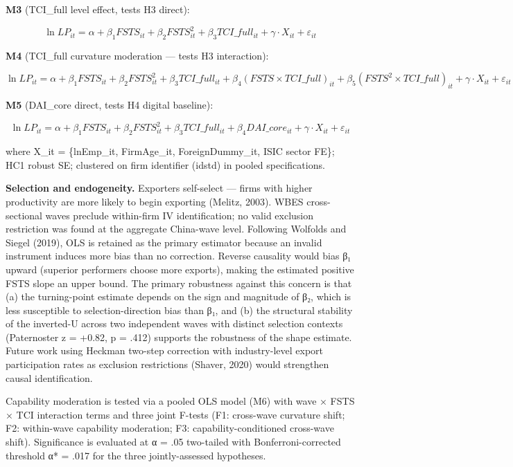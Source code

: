 \documentclass[12pt,a4paper]{article}
\begin{document}
\textbf{M3} (TCI\_full level effect, tests H3 direct):

\[\ln LP_{it} = \alpha + \beta_1 FSTS_{it} + \beta_2 FSTS^2_{it} + \beta_3 TCI\_full_{it} + \gamma \cdot X_{it} + \varepsilon_{it}\]

\textbf{M4} (TCI\_full curvature moderation --- tests H3 interaction):

\[\ln LP_{it} = \alpha + \beta_1 FSTS_{it} + \beta_2 FSTS^2_{it} + \beta_3 TCI\_full_{it} + \beta_4 (FSTS \times TCI\_full)_{it} + \beta_5 (FSTS^2 \times TCI\_full)_{it} + \gamma \cdot X_{it} + \varepsilon_{it}\]

\textbf{M5} (DAI\_core direct, tests H4 digital baseline):

\[\ln LP_{it} = \alpha + \beta_1 FSTS_{it} + \beta_2 FSTS^2_{it} + \beta_3 TCI\_full_{it} + \beta_4 DAI\_core_{it} + \gamma \cdot X_{it} + \varepsilon_{it}\]

where X\_it = \{lnEmp\_it, FirmAge\_it, ForeignDummy\_it, ISIC sector
FE\}; HC1 robust SE; clustered on firm identifier (idstd) in pooled
specifications.

\textbf{Selection and endogeneity.} Exporters self-select --- firms with
higher productivity are more likely to begin exporting (Melitz, 2003).
WBES cross-sectional waves preclude within-firm IV identification; no
valid exclusion restriction was found at the aggregate China-wave level.
Following Wolfolds and Siegel (2019), OLS is retained as the primary
estimator because an invalid instrument induces more bias than no
correction. Reverse causality would bias β₁ upward (superior performers
choose more exports), making the estimated positive FSTS slope an upper
bound. The primary robustness against this concern is that (a) the
turning-point estimate depends on the sign and magnitude of β₂, which is
less susceptible to selection-direction bias than β₁, and (b) the
structural stability of the inverted-U across two independent waves with
distinct selection contexts (Paternoster z = +0.82, p = .412) supports
the robustness of the shape estimate. Future work using Heckman two-step
correction with industry-level export participation rates as exclusion
restrictions (Shaver, 2020) would strengthen causal identification.

Capability moderation is tested via a pooled OLS model (M6) with wave ×
FSTS × TCI interaction terms and three joint F-tests (F1: cross-wave
curvature shift; F2: within-wave capability moderation; F3:
capability-conditioned cross-wave shift). Significance is evaluated at α
= .05 two-tailed with Bonferroni-corrected threshold α* = .017 for the
three jointly-assessed hypotheses.
\end{document}
